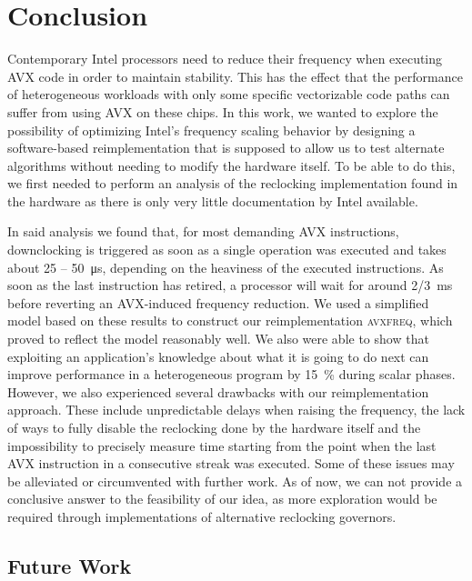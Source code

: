 \chapter{Conclusion}
\label{sec:conclusion}

Contemporary Intel processors need to reduce their frequency when executing \gls{AVX} code in order to maintain stability. This has the effect that the performance of heterogeneous workloads with only some specific vectorizable code paths can suffer from using \gls{AVX} on these chips. In this work, we wanted to explore the possibility of optimizing Intel's frequency scaling behavior by designing a software-based reimplementation that is supposed to allow us to test alternate algorithms without needing to modify the hardware itself. To be able to do this, we first needed to perform an analysis of the reclocking implementation found in the hardware as there is only very little documentation by Intel available.

In said analysis we found that, for most demanding \gls{AVX} instructions, downclocking is triggered as soon as a single operation was executed and takes about 25 -- \SI{50}{\micro\second}, depending on the heaviness of the executed instructions. As soon as the last instruction has retired, a processor will wait for around \SI[quotient-mode=fraction]{2/3}{\milli\second} before reverting an \gls{AVX}-induced frequency reduction. We used a simplified model based on these results to construct our reimplementation \textsc{avxfreq}, which proved to reflect the model reasonably well. We also were able to show that exploiting an application's knowledge about what it is going to do next can improve performance in a heterogeneous program by \SI{15}{\percent} during scalar phases. However, we also experienced several drawbacks with our reimplementation approach. These include unpredictable delays when raising the frequency, the lack of ways to fully disable the reclocking done by the hardware itself and the impossibility to precisely measure time starting from the point when the last \gls{AVX} instruction in a consecutive streak was executed. Some of these issues may be alleviated or circumvented with further work. As of now, we can not provide a conclusive answer to the feasibility of our idea, as more exploration would be required through implementations of alternative reclocking governors.

\section{Future Work}
\label{sec:conclusion:futurework}


